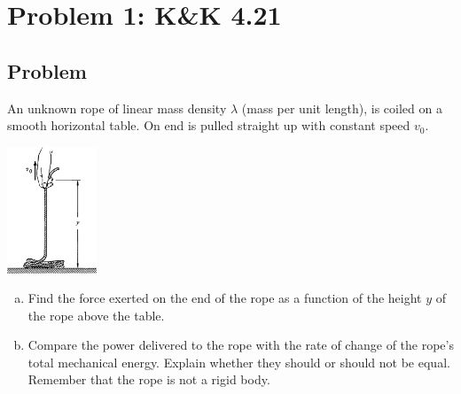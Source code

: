 \documentclass[solutions]{esg8012pset}
\date{October 22}
\begin{document}
\section*{Problem 1: K\&K 4.21}
\subsection*{Problem}
  An unknown rope of linear mass density $\lambda$ (mass per unit length), is coiled on a smooth horizontal table. On end is pulled straight up with constant speed $v_0$.
  \begin{center}\includegraphics[width=0.2\textwidth]{ps07_1}\end{center}
  \begin{enumerate}[(a)]
  \item Find the force exerted on the end of the rope as a function of the height $y$ of the rope above the table.
    \item Compare the power delivered to the rope with the rate of change of the rope's total mechanical energy. Explain whether they should or should not be equal. Remember that the rope is not a rigid body.
  \end{enumerate}
\end{document}
